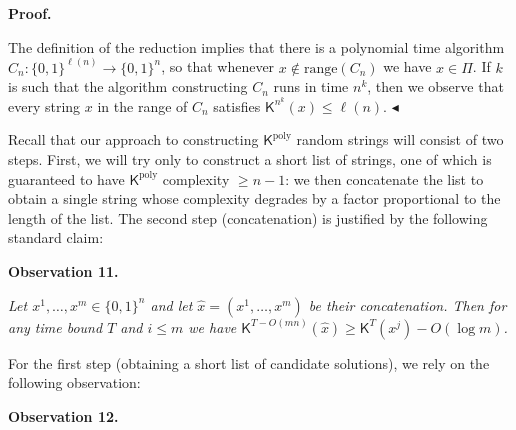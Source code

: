\documentclass[10pt,a4paper]{article}
\begin{document}



\par\medskip\noindent\textbf{Proof.}\par




The definition of the reduction implies that there is a polynomial time algorithm $C_{n}:\{0,1\}^{\ell(n)}\to\{0,1\}^{n}$, so that whenever $x\notin\mathrm{range}(C_{n})$ we have $x\in\Pi$. If $k$ is such that the algorithm constructing $C_{n}$ runs in time $n^{k}$, then we observe that every string $x$ in the range of $C_{n}$ satisfies ${\mathsf{K}}^{n^{k}}(x)\leq\ell(n)$.
$\blacktriangleleft$\par




Recall that our approach to constructing ${\mathsf{K}}^{\mathrm{poly}}$ random strings will consist of two steps. First, we will try only to construct a short list of strings, one of which is guaranteed to have ${\mathsf{K}}^{\mathrm{poly}}$ complexity $\geq n-1$: we then concatenate the list to obtain a single string whose complexity degrades by a factor proportional to the length of the list. The second step (concatenation) is justified by the following standard claim:\par





\par\medskip\noindent\textbf{
\textbf{Observation 11}\textbf{.}
}\par



\emph{Let $x^{1},\ldots,x^{m}\in\{0,1\}^{n}$ and let $\hat{x}=(x^{1},\ldots,x^{m})$ be their concatenation. Then for any time bound $T$ and $i\leq m$ we have ${\mathsf{K}}^{T-O(mn)}(\hat{x})\geq{\mathsf{K}}^{T}(x^{j})-O(\log m)$.}\par






For the first step (obtaining a short list of candidate solutions), we rely on the following observation:\par





\par\medskip\noindent\textbf{
\textbf{Observation 12}\textbf{.}
}\par
\end{document}
